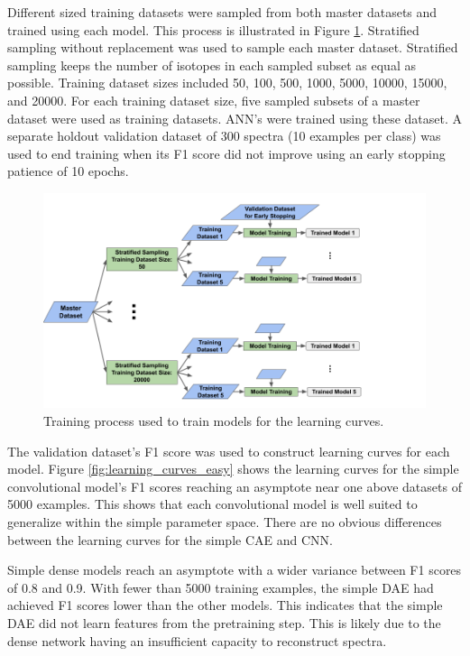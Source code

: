 Different sized training datasets were sampled from both master datasets and trained using each model. This process is illustrated in Figure \ref{fig:learning_curve_training_diagram}. Stratified sampling without replacement was used to sample each master dataset. Stratified sampling keeps the number of isotopes in each sampled subset as equal as possible. Training dataset sizes included 50, 100, 500, 1000, 5000, 10000, 15000, and 20000. For each training dataset size, five sampled subsets of a master dataset were used as training datasets. ANN's were trained using these dataset. A separate holdout validation dataset of 300 spectra (10 examples per class) was used to end training when its F1 score did not improve using an early stopping patience of 10 epochs.

\begin{figure}[H]
	\centering
	\includegraphics[trim=0 0 0 0,clip,width=1.0\linewidth]{images/learning_curve_training_diagram}
	\caption{Training process used to train models for the learning curves.}
	\label{fig:learning_curve_training_diagram}
\end{figure}

The validation dataset's F1 score was used to construct learning curves for each model. Figure \ref{fig:learning_curves_easy} shows the learning curves for the simple convolutional model's F1 scores reaching an asymptote near one above datasets of 5000 examples. This shows that each convolutional model is well suited to generalize within the simple parameter space. There are no obvious differences between the learning curves for the simple CAE and CNN.

Simple dense models reach an asymptote with a wider variance between F1 scores of 0.8 and 0.9. With fewer than 5000 training examples, the simple DAE had achieved F1 scores lower than the other models. This indicates that the simple DAE did not learn features from the pretraining step. This is likely due to the dense network having an insufficient capacity to reconstruct spectra.


